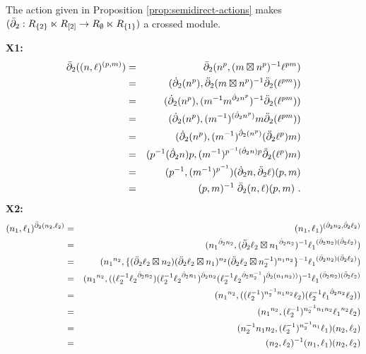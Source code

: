\begin{lem}
The action given in Proposition \ref{prop:semidirect-actions} makes 
$(\bar{\partial}_2: R_{\{2\}} \ltimes R_{[2]} \to R_{\emptyset} \ltimes R_{\{1\}})$
a crossed module.
\end{lem}
\begin{pf}
{\bf X1:}
\vspace{-5mm}
\begin{eqnarray*}
\bar{\partial}_2((n, \ell)^{(p,m)}) 
  & = & \bar{\partial}_2(n^p, (m \boxtimes n^p)^{-1} \ell^{pm}) \\
  & = & (\dot{\partial}_2(n^p), \ddot{\partial}_2(m \boxtimes n^p)^{-1} \ddot{\partial}_2(\ell^{pm})) \\
  & = & (\dot{\partial}_2(n^p), (m^{-1} m^{\dot{\partial}_2 n^p})^{-1} \ddot{\partial}_2(\ell^{pm})) \\
  & = & (\dot{\partial}_2(n^p), (m^{-1})^{(\dot{\partial}_2 n^p)} m \ddot{\partial}_2(\ell^{pm})) \\
  & = & (\dot{\partial}_2(n^p), (m^{-1})^{\dot{\partial}_2 (n^p)} (\ddot{\partial}_2 \ell^p) m) \\
  & = & (p^{-1}(\dot{\partial}_2 n)p, (m^{-1})^{p^{-1}(\dot{\partial}_2 n)p} \ddot{\partial}_2 (\ell^p) m) \\
  & = & (p^{-1}, (m^{-1})^{p^{-1}}) (\dot{\partial}_2 n, \ddot{\partial}_2 \ell) (p,m) \\
  & = & (p,m)^{-1}\;\bar{\partial}_2(n, \ell) (p,m)~.
\end{eqnarray*}
{\bf X2:}
\begin{eqnarray*}
(n_1, \ell_1)^{\bar{\partial}_2(n_2, \ell_2)} 
  & = & (n_1, \ell_1)^{(\dot{\partial}_2 n_2, \ddot{\partial}_2 \ell_2)} \\
  & = & ({n_1}^{\dot{\partial}_2 n_2}, (\ddot{\partial}_2\ell_2 \boxtimes {n_1}^{\dot{\partial}_2 n_2})^{-1} 
          {\ell_1}^{(\dot{\partial}_2 n_2)(\ddot{\partial}_2 \ell_2)}) \\
  & = & ({n_1}^{n_2}, \{(\ddot{\partial}_2 \ell_2 \boxtimes n_2)
          (\ddot{\partial}_2 \ell_2 \boxtimes n_1)^{n_2}
          (\ddot{\partial}_2 \ell_2 \boxtimes n_2^{-1})^{n_1n_2}\}^{-1}  
          {\ell_1}^{(\dot{\partial}_2 n_2)(\ddot{\partial}_2 \ell_2)}) \\
  & = & ({n_1}^{n_2}, ((\ell_2^{-1} {\ell_2}^{\dot{\partial}_2 n_2})
          (\ell_2^{-1} {\ell_2}^{\dot{\partial}_2 n_1})^{\dot{\partial}_2 n_2} 
          (\ell_2^{-1} {\ell_2}^{\dot{\partial}_2 n_2^{-1}})^{\dot{\partial}_2(n_1n_2))})^{-1} 
          {\ell_1}^{(\dot{\partial}_2 n_2)(\ddot{\partial}_2 \ell_2)} \\
  & = & ({n_1}^{n_2}, ((\ell_2^{-1})^{n_2^{-1}n_1n_2} \ell_2) 
          (\ell_2^{-1} {\ell_1}^{\dot{\partial}_2 n_2} \ell_2)) \\
  & = & ({n_1}^{n_2}, (\ell_2^{-1})^{n_2^{-1}n_1n_2} 
          {\ell_1}^{n_2} \ell_2 ) \\
  & = & (n_2^{-1}n_1n_2, (\ell_2^{-1})^{n_2^{-1} n_1} \ell_1)(n_2, \ell_2) \\
  & = & (n_2, \ell_2)^{-1}(n_1, \ell_1)(n_2, \ell_2) 
\end{eqnarray*} 
\end{pf}

